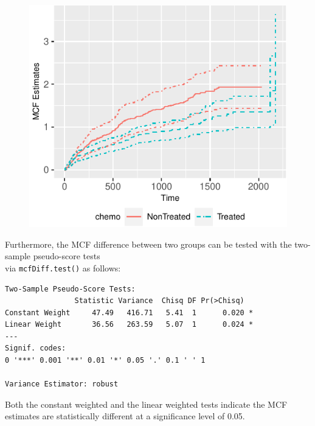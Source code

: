 \begin{figure}[H]
\includegraphics[scale = 1]{reda-mcf_files/figure-latex/plot-sampleMcf-1}
\end{figure}

Furthermore, the MCF difference between two groups can be tested with
the two-sample pseudo-score tests\\
\citep{cook1996biometrics} via \texttt{mcfDiff.test()} as follows:

\begin{Shaded}
\begin{Highlighting}[]
\end{Highlighting}
\end{Shaded}

\begin{verbatim}
Two-Sample Pseudo-Score Tests:
                Statistic Variance  Chisq DF Pr(>Chisq)  
Constant Weight     47.49   416.71   5.41  1      0.020 *
Linear Weight       36.56   263.59   5.07  1      0.024 *
---
Signif. codes:  
0 '***' 0.001 '**' 0.01 '*' 0.05 '.' 0.1 ' ' 1

Variance Estimator: robust 
\end{verbatim}

Both the constant weighted and the linear weighted tests indicate the
MCF estimates are statistically different at a significance level of
0.05.

